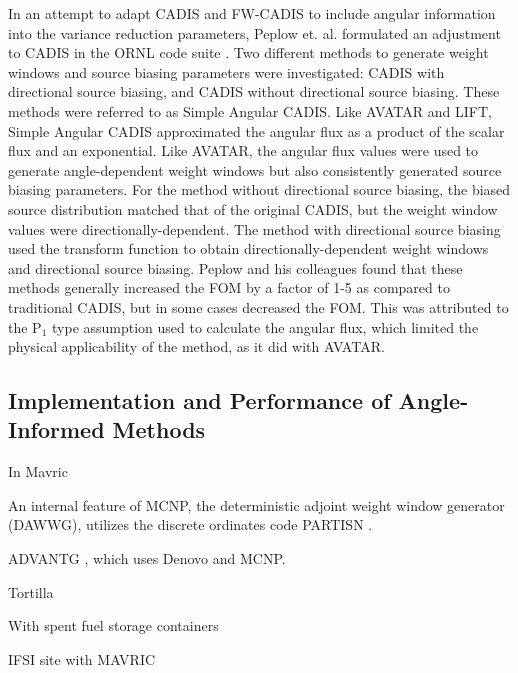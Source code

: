 In an attempt to adapt CADIS and FW-CADIS to include angular information into
the variance reduction parameters,
Peplow et. al. formulated an adjustment to CADIS in the ORNL
code suite \cite{peplow_consistent_2012}. Two different
methods to generate weight windows and source biasing parameters
were investigated:
CADIS with directional source biasing, and CADIS without directional source
biasing. These methods were referred to as Simple Angular CADIS. Like AVATAR and
LIFT, Simple Angular CADIS approximated the angular flux as a product of the
scalar flux and an exponential. Like AVATAR, the angular flux values
were used to
generate angle-dependent weight windows but also consistently generated source
biasing parameters. For the method without
directional source biasing, the biased source distribution matched that of the
original CADIS, but the weight window values were directionally-dependent. The
method with directional source biasing used the transform function to obtain
directionally-dependent weight windows and directional source biasing.
Peplow and his colleagues found
that these methods generally increased the FOM by a factor of 1-5 as compared to
traditional CADIS, but in some
cases decreased the FOM. This was attributed to the P$_1$ type assumption used
to calculate the angular flux, which limited the physical applicability of the
method, as it did with AVATAR.

\subsection{Implementation and Performance of Angle-Informed Methods}
\label{sec:resultsangle}

In Mavric \cite{peplow_advanced_2007}

An internal feature of MCNP, the deterministic adjoint weight window generator (DAWWG), utilizes the discrete ordinates code PARTISN \cite{sweezy_automated_2005}.

ADVANTG \cite{mosher_new_2010, wagner_review_2011, bevill_new_2012}, which uses Denovo \cite{evans_denovo:_2010-1} and MCNP.

Tortilla \cite{somasundaram_implementation_2013}

With spent fuel storage containers \cite{chen_surface_2011}

IFSI site with MAVRIC \cite{sheu_dose_2011}


